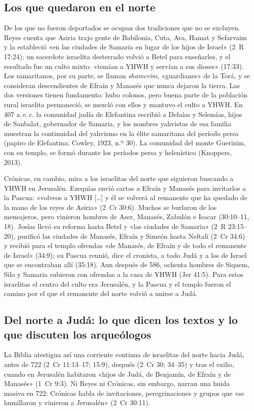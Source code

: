 \documentclass[11pt,letterpaper]{article}
\begin{document}
\subsection{Los que quedaron en el norte}
De los que no fueron deportados se ocupan dos tradiciones que no se excluyen. Reyes cuenta que Asiria trajo gente de Babilonia, Cuta, Ava, Hamat y Sefarvaim y la estableció «en las ciudades de Samaria en lugar de los hijos de Israel» (2~R 17:24); un sacerdote israelita desterrado volvió a Betel para enseñarles, y el resultado fue un culto mixto: «temían a YHWH y servían a sus dioses» (17:33). Los samaritanos, por su parte, se llaman \emph{shamerim}, «guardianes» de la Torá, y se consideran descendientes de Efraín y Manasés que nunca dejaron la tierra. Las dos versiones tienen fundamento: hubo colonos, pero buena parte de la población rural israelita permaneció, se mezcló con ellos y mantuvo el culto a YHWH. En 407 a.\,e.\,c. la comunidad judía de Elefantina escribió a Delaías y Selemías, hijos de Sanbalat, gobernador de Samaria, y los nombres yahvistas de esa familia muestran la continuidad del yahvismo en la élite samaritana del período persa (papiro de Elefantina; Cowley, 1923, n.º 30). La comunidad del monte Guerizim, con su templo, se formó durante los períodos persa y helenístico (Knoppers, 2013).

Crónicas, en cambio, mira a los israelitas del norte que siguieron buscando a YHWH en Jerusalén. Ezequías envió cartas a Efraín y Manasés para invitarlos a la Pascua: «volveos a YHWH [\ldots] y él se volverá al remanente que ha quedado de la mano de los reyes de Asiria» (2~Cr 30:6). Muchos se burlaron de los mensajeros, pero vinieron hombres de Aser, Manasés, Zabulón e Isacar (30:10--11, 18). Josías llevó su reforma hasta Betel y «las ciudades de Samaria» (2~R 23:15--20), purificó las ciudades de Manasés, Efraín y Simeón hasta Neftalí (2~Cr 34:6) y recibió para el templo ofrendas «de Manasés, de Efraín y de todo el remanente de Israel» (34:9); su Pascua reunió, dice el cronista, a todo Judá y a los de Israel que se encontraban allí (35:18). Aun después de 586, ochenta hombres de Siquem, Silo y Samaria subieron con ofrendas a la casa de YHWH (Jer 41:5). Para estos israelitas el centro del culto era Jerusalén, y la Pascua y el templo fueron el camino por el que el remanente del norte volvió a unirse a Judá.

\subsection{Del norte a Judá: lo que dicen los textos y lo que discuten los arqueólogos}
La Biblia atestigua así una corriente continua de israelitas del norte hacia Judá, antes de 722 (2~Cr 11:13--17; 15:9), después (2~Cr 30; 34--35) y tras el exilio, cuando en Jerusalén habitaron «hijos de Judá, de Benjamín, de Efraín y de Manasés» (1~Cr 9:3). Ni Reyes ni Crónicas, sin embargo, narran una huida masiva en 722: Crónicas habla de invitaciones, peregrinaciones y grupos que «se humillaron y vinieron a Jerusalén» (2~Cr 30:11).
\end{document}
